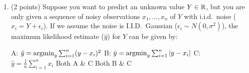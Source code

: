 \begin{enumerate}[start]
\item (2 points) Suppose you want to predict an unknown value $Y \in \mathbb{R}$, but you are only given
a sequence of noisy observations $x_1, \dots, x_n$ of $Y$ with i.i.d.\ noise ($x_i = Y + \epsilon_i $). If we assume the noise is I.I.D.\ Gaussian ($\epsilon_i \sim N(0, \sigma^2)$), the maximum likelihood
estimate ($\hat y$) for $Y$ can be given by: 


\begin{checkboxes}
	\choice A: $ \hat y = \mathop{\mathrm{argmin}}_y \sum_{i=1}^{n} (y - x_i)^2 $ 
	\choice B: $ \hat y = \mathop{\mathrm{argmin}}_y \sum_{i=1}^{n} |y - x_i| $
	\choice C: $\hat y = \frac{1}{n} \sum_{i=1}^{n} x_i $
	\choice Both A \&  C
	\choice Both B \& C
	
\end{checkboxes}
\end{enumerate}
\pagebreak